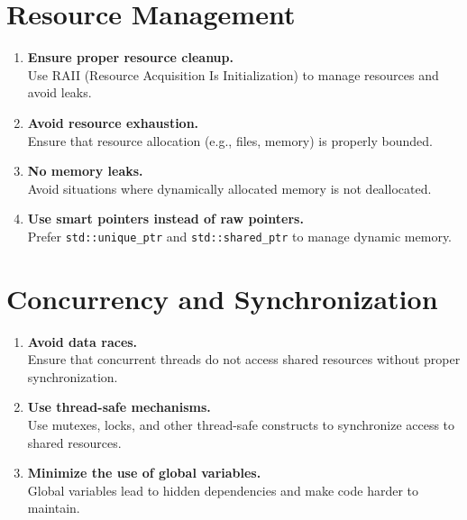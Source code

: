 \section{Resource Management}
\begin{enumerate}
    \item \textbf{Ensure proper resource cleanup.} \\
    Use RAII (Resource Acquisition Is Initialization) to manage resources and avoid leaks.

    \item \textbf{Avoid resource exhaustion.} \\
    Ensure that resource allocation (e.g., files, memory) is properly bounded.

    \item \textbf{No memory leaks.} \\
    Avoid situations where dynamically allocated memory is not deallocated.

    \item \textbf{Use smart pointers instead of raw pointers.} \\
    Prefer \texttt{std::unique\_ptr} and \texttt{std::shared\_ptr} to manage dynamic memory.
\end{enumerate}

\section{Concurrency and Synchronization}
\begin{enumerate}
    \item \textbf{Avoid data races.} \\
    Ensure that concurrent threads do not access shared resources without proper synchronization.

    \item \textbf{Use thread-safe mechanisms.} \\
    Use mutexes, locks, and other thread-safe constructs to synchronize access to shared resources.

    \item \textbf{Minimize the use of global variables.} \\
    Global variables lead to hidden dependencies and make code harder to maintain.
\end{enumerate}

